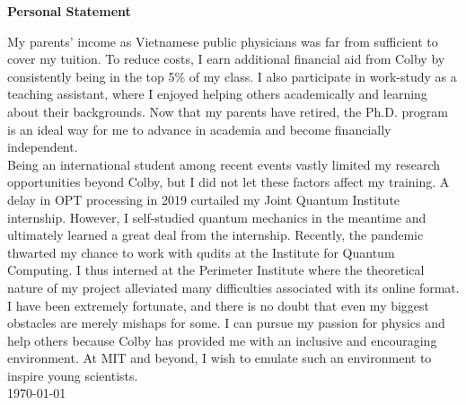 \documentclass[12pt]{article}
\begin{document}
\begin{center}
	\textbf{Personal Statement}
\end{center}

My parents' income as Vietnamese public physicians was far from sufficient to cover my tuition. To reduce costs, I earn additional financial aid from Colby by consistently being in the top 5\% of my class. I also participate in work-study as a teaching assistant, where I enjoyed helping others academically and learning about their backgrounds. Now that my parents have retired, the Ph.D. program is an ideal way for me to advance in academia and become financially independent. \\


Being an international student among recent events vastly limited my research opportunities beyond Colby, but I did not let these factors affect my training. A delay in OPT processing in 2019 curtailed my Joint Quantum Institute internship. However, I self-studied quantum mechanics in the meantime and ultimately learned a great deal from the internship. Recently, the pandemic thwarted my chance to work with qudits at the Institute for Quantum Computing. I thus interned at the Perimeter Institute where the theoretical nature of my project alleviated many difficulties associated with its online format.  \\

I have been extremely fortunate, and there is no doubt that even my biggest obstacles are merely mishaps for some. I can pursue my passion for physics and help others because Colby has provided me with an inclusive and encouraging environment. At MIT and beyond, I wish to emulate such an environment to inspire young scientists.\\



\noindent \today
\end{document}
